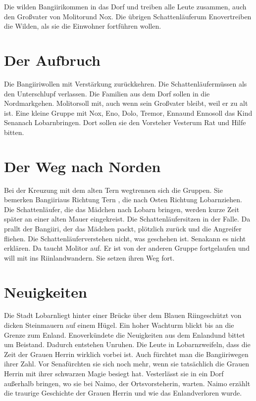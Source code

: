 \documentclass[12pt,a4paper,onecolumn,twoside,ngerman]{book}
\newcommand{\Tern}{Tern }
\newcommand{\Molitor}{Molitor}
\newcommand{\Ternweg}{{\Tern}weg}
\newcommand{\Sena}{Sena}
\newcommand{\Bangiri}{Bangiiri}
\newcommand{\Enland}{Enland}
\newcommand{\Schattenlaufer}{Schattenläufer}
\newcommand{\Eno}{Eno}
\newcommand{\Dolo}{Dolo}
\newcommand{\Nox}{Nox}
\newcommand{\Enna}{Enna}
\newcommand{\Enno}{Enno}
\newcommand{\Tremor}{Tremor}
\newcommand{\Lobarn}{Lobarn}
\newcommand{\Vester}{Vester}
\newcommand{\Naimo}{Naimo}
\newcommand{\Nordmark}{Nordmark}
\newcommand{\Rhinland}{Riinland}
\newcommand{\Rhin}{Riin}
\begin{document}
Die wilden \Bangiri  kommen in das Dorf und treiben alle Leute zusammen, auch den Großvater von \Molitor und \Nox . Die übrigen \Schattenlaufer  um \Eno  vertreiben die Wilden, als sie die Einwohner fortführen wollen.

\section{Der Aufbruch}
Die \Bangiri  wollen mit Verstärkung zurückkehren. Die \Schattenlaufer  müssen als den Unterschlupf verlassen. Die Familien aus dem Dorf sollen in die \Nordmark  gehen. \Molitor  soll mit, auch wenn sein Großvater bleibt, weil er zu alt ist.
Eine kleine Gruppe mit \Nox , \Eno , \Dolo , \Tremor , \Enna  und \Enno  soll das Kind \Sena  nach \Lobarn  bringen. Dort sollen sie den Vorsteher \Vester  um Rat und Hilfe bitten.

\section{Der Weg nach Norden}
Bei der Kreuzung mit dem alten \Ternweg  trennen sich die Gruppen. Sie bemerken \Bangiri  aus Richtung \Tern , die nach Osten Richtung \Lobarn  ziehen. Die \Schattenlaufer , die das Mädchen nach \Lobarn  
 bringen, werden kurze Zeit später an einer alten Mauer eingekreist. Die \Schattenlaufer  sitzen in der Falle. Da prallt der \Bangiri , der das Mädchen packt, plötzlich zurück und die Angreifer fliehen. Die \Schattenlaufer  verstehen nicht, was geschehen ist. \Sena  kann es nicht erklären. Da taucht \Molitor
  auf. Er ist von der anderen Gruppe fortgelaufen und will mit ins \Rhinland  wandern. Sie setzen ihren Weg fort.

\section{Neuigkeiten}
Die Stadt \Lobarn  liegt hinter einer Brücke über dem Blauen \Rhin  geschützt von dicken Steinmauern auf einem Hügel. Ein hoher Wachturm blickt bis an die Grenze zum \Enland .
\Eno  verkündete die Neuigkeiten aus dem \Enland  und bittet um Beistand. Dadurch entstehen Unruhen. Die Leute in \Lobarn  zweifeln, dass die Zeit der Grauen Herrin wirklich vorbei ist. Auch fürchtet man die \Bangiri  wegen ihrer Zahl. Vor \Sena  fürchten sie sich noch mehr, wenn sie tatsächlich die Grauen Herrin mit ihrer schwarzen Magie besiegt hat. 
\Vester  lässt sie in ein Dorf außerhalb bringen, wo sie bei \Naimo , der Ortsvorsteherin, warten. \Naimo
  erzählt die traurige Geschichte der Grauen Herrin und wie das \Enland verloren wurde.
\end{document}

